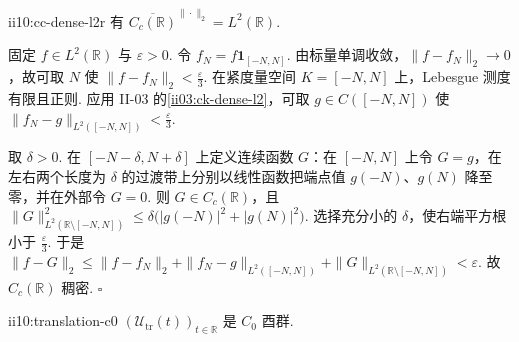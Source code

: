 \begin{FALemma}{ii10:cc-dense-l2r}
有 \(\displaystyle \overline{C_c(\mathbb R)}^{\|\cdot\|_2}=L^2(\mathbb R).\)
\end{FALemma}

\begin{FAProof}
固定 \(\displaystyle f\in L^2(\mathbb R)\) 与 \(\displaystyle\varepsilon>0\). 令 \(\displaystyle f_N=f\mathbf{1}_{[-N,N]}.\)
由标量单调收敛，\(\displaystyle\|f-f_N\|_2\to0\)，故可取 \(\displaystyle N\) 使 \(\displaystyle \|f-f_N\|_2<\frac{\varepsilon}{3}.\)
在紧度量空间 \(\displaystyle K=[-N,N]\) 上，Lebesgue 测度有限且正则. 应用 II-03 的\autoref{ii03:ck-dense-l2}，可取 \(\displaystyle g\in C([-N,N])\) 使 \(\displaystyle \|f_N-g\|_{L^2([-N,N])}<\frac{\varepsilon}{3}.\)

取 \(\displaystyle\delta>0\). 在 \(\displaystyle[-N-\delta,N+\delta]\) 上定义连续函数 \(\displaystyle G\)：在 \(\displaystyle[-N,N]\) 上令 \(\displaystyle G=g\)，在左右两个长度为 \(\displaystyle\delta\) 的过渡带上分别以线性函数把端点值 \(\displaystyle g(-N)\)、\(\displaystyle g(N)\) 降至零，并在外部令 \(\displaystyle G=0\). 则 \(\displaystyle G\in C_c(\mathbb R)\)，且 \(\displaystyle \|G\|_{L^2(\mathbb R\setminus[-N,N])}^2 \leqslant \delta\bigl(|g(-N)|^2+|g(N)|^2\bigr).\)
选择充分小的 \(\displaystyle\delta\)，使右端平方根小于 \(\displaystyle\frac{\varepsilon}{3}\). 于是 \(\displaystyle \|f-G\|_2 \leqslant \|f-f_N\|_2 + \|f_N-g\|_{L^2([-N,N])} + \|G\|_{L^2(\mathbb R\setminus[-N,N])} <\varepsilon.\)
故 \(\displaystyle C_c(\mathbb R)\) 稠密.
\hfill\(\square\)
\end{FAProof}

\begin{FAProposition}[B][平移群的强连续性]{ii10:translation-c0}
\(\displaystyle(\mathcal U_{\mathrm{tr}}(t))_{t\in\mathbb R}\) 是 \(\displaystyle C_0\) 酉群.
\end{FAProposition}

